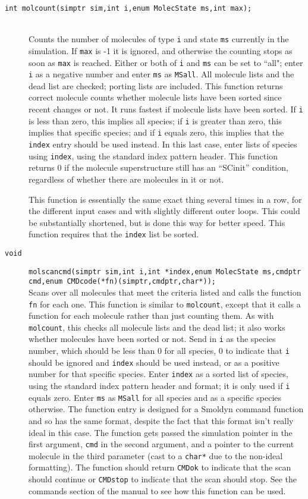 \documentclass {scrbook}
\newcommand {\ttt} {\texttt}
\begin{document}
\begin{description}
\item[\ttt{int molcount(simptr sim,int i,enum MolecState ms,int max);}]
\hfill \\
Counts the number of molecules of type \ttt{i} and state \ttt{ms} currently in the simulation. If \ttt{max} is -1 it is ignored, and otherwise the counting stops as soon as \ttt{max} is reached. Either or both of \ttt{i} and \ttt{ms} can be set to ``all"; enter \ttt{i} as a negative number and enter \ttt{ms} as \ttt{MSall}. All molecule lists and the dead list are checked; porting lists are included. This function returns correct molecule counts whether molecule lists have been sorted since recent changes or not. It runs fastest if molecule lists have been sorted. If \ttt{i} is less than zero, this implies all species; if \ttt{i} is greater than zero, this implies that specific species; and if \ttt{i} equals zero, this implies that the \ttt{index} entry should be used instead. In this last case, enter lists of species using \ttt{index}, using the standard index pattern header. This function returns 0 if the molecule superstructure still has an ``SCinit'' condition, regardless of whether there are molecules in it or not.

This function is essentially the same exact thing several times in a row, for the different input cases and with slightly different outer loops. This could be substantially shortened, but is done this way for better speed. This function requires that the \ttt{index} list be sorted.

\item[\ttt{void}]
\ttt{molscancmd(simptr sim,int i,int *index,enum MolecState ms,cmdptr cmd,enum CMDcode(*fn)(simptr,cmdptr,char*));}
\hfill \\
Scans over all molecules that meet the criteria listed and calls the function \ttt{fn} for each one. This function is similar to \ttt{molcount}, except that it calls a function for each molecule rather than just counting them. As with \ttt{molcount}, this checks all molecule lists and the dead list; it also works whether molecules have been sorted or not. Send in \ttt{i} as the species number, which should be less than 0 for all species, 0 to indicate that \ttt{i} should be ignored and \ttt{index} should be used instead, or as a positive number for that specific species. Enter \ttt{index} as a sorted list of species, using the standard index pattern header and format; it is only used if \ttt{i} equals zero. Enter \ttt{ms} as \ttt{MSall} for all species and as a specific species otherwise. The function entry is designed for a Smoldyn command function and so has the same format, despite the fact that this format isn't really ideal in this case. The function gets passed the simulation pointer in the first argument, \ttt{cmd} in the second argument, and a pointer to the current molecule in the third parameter (cast to a \ttt{char*} due to the non-ideal formatting). The function should return \ttt{CMDok} to indicate that the scan should continue or \ttt{CMDstop} to indicate that the scan should stop. See the commands section of the manual to see how this function can be used.


\end{description}
\end{document}
